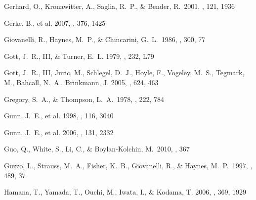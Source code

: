 \documentclass[]{emulateapj}
\begin{document}
\begin{thebibliography}{999}
Gerhard, O., Kronawitter, A., Saglia, R.~P.,
\& Bender, R.\ 2001, \aj, 121, 1936

Gerke, B., et al. 2007, \mnras, 376, 1425

Giovanelli, R., Haynes, M.~P., \& Chincarini, G.~L.\ 1986, \apj, 300, 77



Gott, J.\ R., III, \& Turner, E.\ L. 1979, \apj, 232, L79

Gott, J.\ R., III, Juric, M., Schlegel, D.\ J., Hoyle, F., Vogeley, M.\ S., 
Tegmark, M., Bahcall, N.\ A., Brinkmann, J. 2005, \apj, 624, 463

Gregory, S.~A., \& Thompson, L.~A.\ 1978, \apj, 222, 784

Gunn, J.\ E., et al. 1998, \aj, 116, 3040

Gunn, J.\ E., et al. 2006, \aj, 131, 2332

Guo, Q., White, S., Li, C., \& Boylan-Kolchin, M.\ 2010, \mnras, 367 


Guzzo, L., Strauss, M.\ 
A., Fisher, K.\ B., Giovanelli, R., \& Haynes, M.\ P.\ 1997, \apj, 489, 37

Hamana, T., Yamada, T., Ouchi, M., Iwata, I., \& Kodama, T. 2006,
\mnras, 369, 1929 %


\end{thebibliography}
\end{document}
